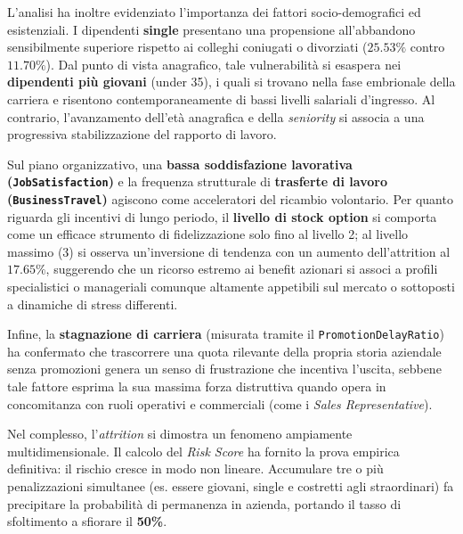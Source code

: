 \documentclass[11pt,a4paper]{article}
\begin{document}
L’analisi ha inoltre evidenziato l'importanza dei fattori socio-demografici ed esistenziali. I dipendenti \textbf{single} presentano una propensione all’abbandono sensibilmente superiore rispetto ai colleghi coniugati o divorziati ($25.53\%$ contro $11.70\%$). Dal punto di vista anagrafico, tale vulnerabilità si esaspera nei \textbf{dipendenti più giovani} (under 35), i quali si trovano nella fase embrionale della carriera e risentono contemporaneamente di bassi livelli salariali d'ingresso. Al contrario, l'avanzamento dell'età anagrafica e della \textit{seniority} si associa a una progressiva stabilizzazione del rapporto di lavoro.

Sul piano organizzativo, una \textbf{bassa soddisfazione lavorativa (\texttt{JobSatisfaction})} e la frequenza strutturale di \textbf{trasferte di lavoro (\texttt{BusinessTravel})} agiscono come acceleratori del ricambio volontario. Per quanto riguarda gli incentivi di lungo periodo, il \textbf{livello di stock option} si comporta come un efficace strumento di fidelizzazione solo fino al livello 2; al livello massimo (3) si osserva un'inversione di tendenza con un aumento dell'attrition al $17.65\%$, suggerendo che un ricorso estremo ai benefit azionari si associ a profili specialistici o manageriali comunque altamente appetibili sul mercato o sottoposti a dinamiche di stress differenti. 

Infine, la \textbf{stagnazione di carriera} (misurata tramite il \texttt{PromotionDelayRatio}) ha confermato che trascorrere una quota rilevante della propria storia aziendale senza promozioni genera un senso di frustrazione che incentiva l'uscita, sebbene tale fattore esprima la sua massima forza distruttiva quando opera in concomitanza con ruoli operativi e commerciali (come i \textit{Sales Representative}).

Nel complesso, l’\textit{attrition} si dimostra un fenomeno ampiamente multidimensionale. Il calcolo del \textit{Risk Score} ha fornito la prova empirica definitiva: il rischio cresce in modo non lineare. Accumulare tre o più penalizzazioni simultanee (es. essere giovani, single e costretti agli straordinari) fa precipitare la probabilità di permanenza in azienda, portando il tasso di sfoltimento a sfiorare il \textbf{50\%}.
\end{document}
